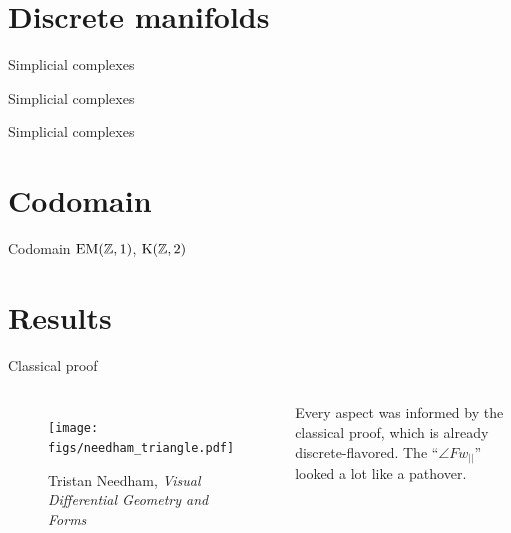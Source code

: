 \documentclass[14pt,aspectratio=169,compress]{beamer}
\begin{document}
\section{Discrete manifolds}

\begin{frame}{Simplicial complexes}

\end{frame}

\begin{frame}{Simplicial complexes}

\end{frame}

\begin{frame}{Simplicial complexes}

\end{frame}

\section{Codomain}

\begin{frame}{Codomain}
\( \mathrm{EM}(\mathbb{Z},1) \), \( \mathrm{K}(\mathbb{Z},2) \)
\end{frame}

\section{Results}
\begin{frame}{Classical proof}
\begin{columns}
\begin{figure}
\texttt{[image: figs/needham\_triangle.pdf]}
\caption{Tristan Needham, \emph{Visual Differential Geometry and Forms}}
\end{figure}
Every aspect was informed by the classical proof, which is already discrete-flavored. The ``\( \angle Fw_{||} \)'' looked a lot like a pathover.
\end{columns}
\end{frame}
\end{document}
